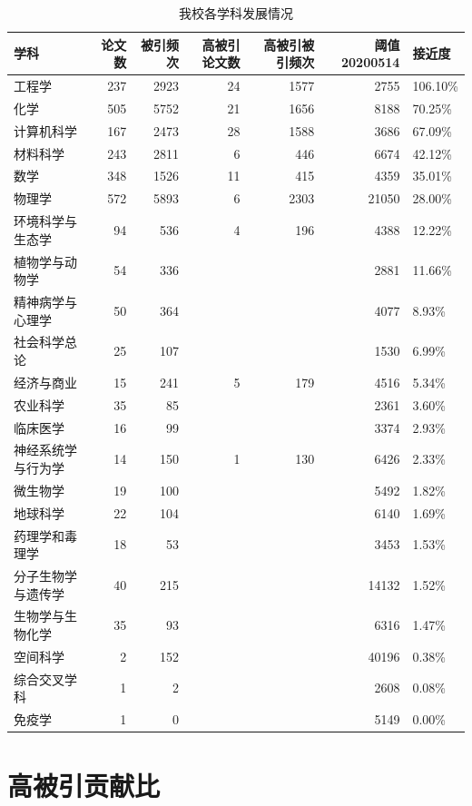\documentclass[cn, 11pt, fancy, hide]{elegantbook}
\begin{document}
\begin{table}[!h]

\caption{\label{tab:unnamed-chunk-24}我校各学科发展情况}
\centering
\begin{tabular}[t]{lrrrrrl}
\toprule
学科 & 论文数 & 被引频次 & 高被引论文数 & 高被引被引频次 & 阈值20200514 & 接近度\\
\midrule
工程学 & 237 & 2923 & 24 & 1577 & 2755 & 106.10\%\\
化学 & 505 & 5752 & 21 & 1656 & 8188 & 70.25\%\\
计算机科学 & 167 & 2473 & 28 & 1588 & 3686 & 67.09\%\\
材料科学 & 243 & 2811 & 6 & 446 & 6674 & 42.12\%\\
数学 & 348 & 1526 & 11 & 415 & 4359 & 35.01\%\\
\addlinespace
物理学 & 572 & 5893 & 6 & 2303 & 21050 & 28.00\%\\
环境科学与生态学 & 94 & 536 & 4 & 196 & 4388 & 12.22\%\\
植物学与动物学 & 54 & 336 &  &  & 2881 & 11.66\%\\
精神病学与心理学 & 50 & 364 &  &  & 4077 & 8.93\%\\
社会科学总论 & 25 & 107 &  &  & 1530 & 6.99\%\\
\addlinespace
经济与商业 & 15 & 241 & 5 & 179 & 4516 & 5.34\%\\
农业科学 & 35 & 85 &  &  & 2361 & 3.60\%\\
临床医学 & 16 & 99 &  &  & 3374 & 2.93\%\\
神经系统学与行为学 & 14 & 150 & 1 & 130 & 6426 & 2.33\%\\
微生物学 & 19 & 100 &  &  & 5492 & 1.82\%\\
\addlinespace
地球科学 & 22 & 104 &  &  & 6140 & 1.69\%\\
药理学和毒理学 & 18 & 53 &  &  & 3453 & 1.53\%\\
分子生物学与遗传学 & 40 & 215 &  &  & 14132 & 1.52\%\\
生物学与生物化学 & 35 & 93 &  &  & 6316 & 1.47\%\\
空间科学 & 2 & 152 &  &  & 40196 & 0.38\%\\
\addlinespace
综合交叉学科 & 1 & 2 &  &  & 2608 & 0.08\%\\
免疫学 & 1 & 0 &  &  & 5149 & 0.00\%\\
\bottomrule
\end{tabular}
\end{table}

\hypertarget{ux9ad8ux88abux5f15ux8d21ux732eux6bd4}{%
\section{高被引贡献比}\label{ux9ad8ux88abux5f15ux8d21ux732eux6bd4}}
\end{document}

